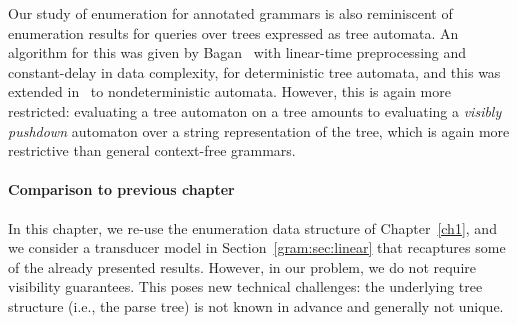 Our study of enumeration for annotated grammars is also reminiscent of
enumeration results for queries over trees expressed as tree automata. An
algorithm for this was given by Bagan~\cite{bagan2006mso} with linear-time
preprocessing and constant-delay in data complexity, for deterministic tree
automata, and this was extended in~\cite{amarilli2019enumeration} to
nondeterministic automata. However, this is again more restricted:
evaluating a tree automaton on a tree amounts to evaluating a \emph{visibly
pushdown} automaton over a string representation of the tree, which is again
more restrictive than general context-free grammars.

%

\paragraph{Comparison to previous chapter}
In this chapter, we re-use the
enumeration data structure of Chapter~\ref{ch1}, and we consider a transducer model in
Section~\ref{gram:sec:linear} that recaptures some of the already presented results. 
However, in our
problem, we do not require visibility guarantees. This poses new technical
challenges: the underlying tree structure (i.e., the parse tree) is not known in
advance and generally not unique.

